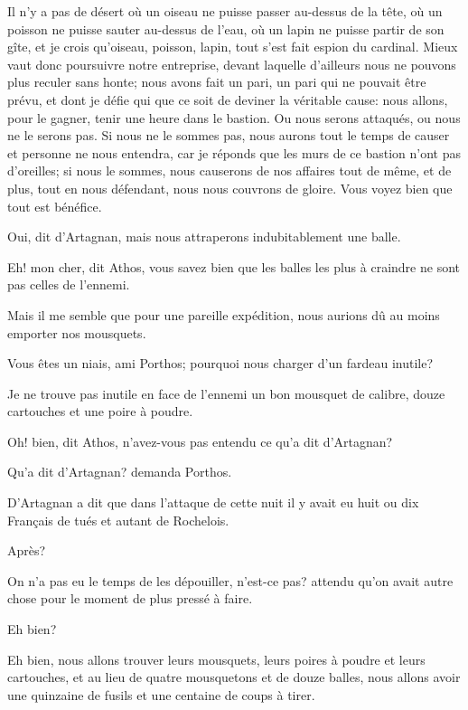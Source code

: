 \speak  Il n'y a pas de désert où un oiseau ne puisse passer au-dessus de la tête, où un poisson ne puisse sauter au-dessus de l'eau, où un lapin ne puisse partir de son gîte, et je crois qu'oiseau, poisson, lapin, tout s'est fait espion du cardinal. Mieux vaut donc poursuivre notre entreprise, devant laquelle d'ailleurs nous ne pouvons plus reculer sans honte; nous avons fait un pari, un pari qui ne pouvait être prévu, et dont je défie qui que ce soit de deviner la véritable cause: nous allons, pour le gagner, tenir une heure dans le bastion. Ou nous serons attaqués, ou nous ne le serons pas. Si nous ne le sommes pas, nous aurons tout le temps de causer et personne ne nous entendra, car je réponds que les murs de ce bastion n'ont pas d'oreilles; si nous le sommes, nous causerons de nos affaires tout de même, et de plus, tout en nous défendant, nous nous couvrons de gloire. Vous voyez bien que tout est bénéfice. 

\speak  Oui, dit d'Artagnan, mais nous attraperons indubitablement une balle. 

\speak  Eh! mon cher, dit Athos, vous savez bien que les balles les plus à craindre ne sont pas celles de l'ennemi. 

\speak  Mais il me semble que pour une pareille expédition, nous aurions dû au moins emporter nos mousquets. 

\speak  Vous êtes un niais, ami Porthos; pourquoi nous charger d'un fardeau inutile? 

\speak  Je ne trouve pas inutile en face de l'ennemi un bon mousquet de calibre, douze cartouches et une poire à poudre. 

\speak  Oh! bien, dit Athos, n'avez-vous pas entendu ce qu'a dit d'Artagnan? 

\speak  Qu'a dit d'Artagnan? demanda Porthos. 

\speak  D'Artagnan a dit que dans l'attaque de cette nuit il y avait eu huit ou dix Français de tués et autant de Rochelois. 

\speak  Après? 

\speak  On n'a pas eu le temps de les dépouiller, n'est-ce pas? attendu qu'on avait autre chose pour le moment de plus pressé à faire. 

\speak  Eh bien? 

\speak  Eh bien, nous allons trouver leurs mousquets, leurs poires à poudre et leurs cartouches, et au lieu de quatre mousquetons et de douze balles, nous allons avoir une quinzaine de fusils et une centaine de coups à tirer. 

